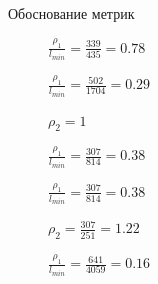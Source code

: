 \documentclass[russian, hyperref={unicode}]{beamer}
\begin{document}
\begin{frame}[noframenumbering, t]{Обоснование метрик}
     {
        \begin{figure}

            $\frac{\rho_1}{l_{min}} = \frac{339}{435} = 0.78$
        \end{figure}
    }
     {
        \begin{figure}

            $\frac{\rho_1}{l_{min}} = \frac{502}{1704} = 0.29$

            $\rho_2 = 1$
        \end{figure}
    }
     {
        \begin{figure}

            $\frac{\rho_1}{l_{min}} = \frac{307}{814} = 0.38$
        \end{figure}
    }
     {
        \begin{figure}

            $\frac{\rho_1}{l_{min}} = \frac{307}{814} = 0.38$

            $\rho_2 = \frac{307}{251} = 1.22$
        \end{figure}
    }
     {
        \begin{figure}

            $\frac{\rho_1}{l_{min}} = \frac{641}{4059} = 0.16$
        \end{figure}
    }
\end{frame}

\newcommand{\potentialsupdatepicture}[1] {
    \texttt{[image: Solution/potentials-update/\#1]}
}
\end{document}
